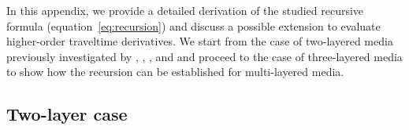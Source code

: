 In this appendix, we provide a detailed derivation of the studied recursive formula (equation~\ref{eq:recursion}) and discuss a possible extension to evaluate higher-order traveltime derivatives. We start from the case of two-layered media previously investigated by \cite{blias1981}, \cite{bliasgrit1984},  \cite{gritsenko}, and \cite{goldin} and proceed to the case of three-layered media to show how the recursion can be established for multi-layered media.

\subsection{Two-layer case}


